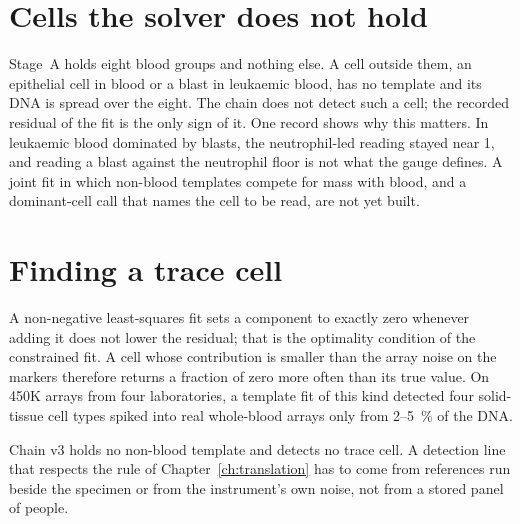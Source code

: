 \section{Cells the solver does not hold}

Stage~A holds eight blood groups and nothing else. A cell outside them, an epithelial cell in blood or a blast in leukaemic blood, has no template
and its DNA is spread over the eight. The chain does not detect such a cell; the recorded residual of the fit is the only sign of it. One record
shows why this matters. In leukaemic blood dominated by blasts, the neutrophil-led reading stayed near 1, and reading a blast against the neutrophil
floor is not what the gauge defines. \measured{} A joint fit in which non-blood templates compete for
mass with blood, and a dominant-cell call that names the cell to be read, are not yet built. \openprob

\section{Finding a trace cell}\label{sec:p4tracecell}

A non-negative least-squares fit sets a component to exactly zero whenever adding it does not lower the residual; that is the
optimality condition of the constrained fit. \derived{} A cell whose contribution is smaller than the array noise on the markers
therefore returns a fraction of zero more often than its true value. On 450K arrays from four laboratories, a template fit of this
kind detected four solid-tissue cell types spiked into real whole-blood arrays only from 2--5~\% of the DNA. \measured

\begin{keybox}[title=Status]
Chain v3 holds no non-blood template and detects no trace cell. A detection line that respects the rule of Chapter~\ref{ch:translation}
has to come from references run beside the specimen or from the instrument's own noise, not from a stored panel of people. \openprob
\end{keybox}
